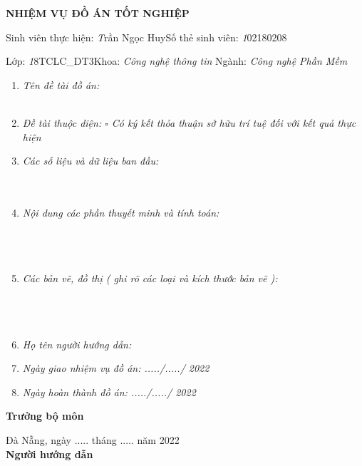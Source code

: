 \documentclass[11pt]{report}
\newcommand{\at}{Đà Nẵng, ngày ..... tháng ..... năm 2022}
\newcommand{\me}{Trần Ngọc Huy}
\newcommand{\msv}{102180208}
\newcommand{\myclass}{18TCLC\_DT3}
\begin{document}
	\center\Large\textbf{NHIỆM VỤ ĐỒ ÁN TỐT NGHIỆP}
	\vspace{14px}
	\fontsize{12px}{12px}\selectfont
	
	Sinh viên thực hiện: \emph\me \dotfill Số thẻ sinh viên: \emph\msv \dotfill 
	
	Lớp: \emph\myclass \dotfill Khoa: \emph{Công nghệ thông tin} \dotfill Ngành: \emph{Công nghệ Phần Mềm} \dotfill
	
	\begin{enumerate}[before=\fontsize{13px}{13px}\selectfont]
		\item\emph{Tên đề tài đồ án: \\\dotfill\\\dotfill}
		\item\emph{Đề tài thuộc diện: $\square$ Có ký kết thỏa thuận sở hữu trí tuệ đối với kết quả thực hiện}
		\item\emph{Các số liệu và dữ liệu ban đầu:\\\dotfill\\\dotfill\\\dotfill}
		\item\emph{Nội dung các phần thuyết minh và tính toán:}
		\\\dotfill\\\dotfill\\\dotfill\\\dotfill
		\item\emph{Các bản vẽ, đồ thị ( ghi rõ các loại và kích thước bản vẽ ):}
		\\\dotfill\\\dotfill\\\dotfill\\\dotfill
		\item\emph{Họ tên người hướng dẫn: \dotfill}
		\item\emph{Ngày giao nhiệm vụ đồ án: ...../...../ 2022 \dotfill}
		\item\emph{Ngày hoàn thành đồ án: ...../...../ 2022 \dotfill}
		
	\end{enumerate}
	\raggedright
	\begin{minipage}[t]{.5\textwidth}
		
		\textbf{Trưởng bộ môn} \dotfill
	\end{minipage}\hfill 
	\begin{minipage}[t]{.5\textwidth}
		\center
		\at\\
		\textbf{Người hướng dẫn}
	\end{minipage}\\[2em]
	\pagebreak
	
\end{document}
